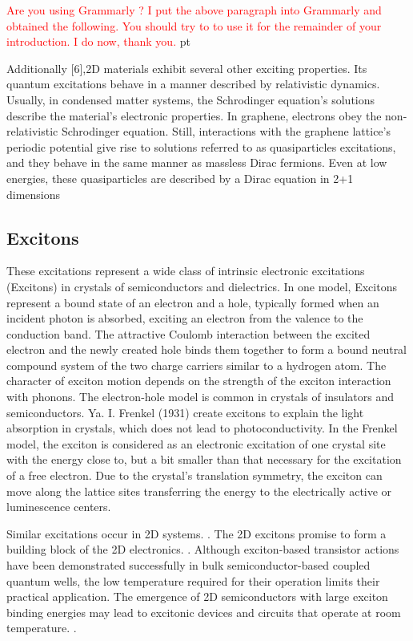 \textcolor{red}{Are you using Grammarly ? I put the above paragraph into Grammarly and obtained the following. You should
try to to use it for the remainder of your introduction.
I do now, thank you.}
 pt

Additionally [6],2D materials exhibit several other exciting properties. Its quantum excitations behave in a manner described by relativistic dynamics. Usually, in condensed matter systems, the Schrodinger equation's solutions describe the material's electronic properties. In graphene, electrons obey the non-relativistic Schrodinger equation. Still, interactions with the graphene lattice's periodic potential give rise to solutions referred to as quasiparticles excitations, and they behave in the same manner as massless Dirac fermions. Even at low energies, these quasiparticles are described by a Dirac equation in 2+1 dimensions 

\subsection{Excitons}
These excitations represent a wide class of intrinsic electronic excitations (Excitons) \cite{Excitons1, Excitons2} in crystals of semiconductors and dielectrics. In one model, Excitons represent a bound state of an electron and a hole, typically formed when an incident photon is absorbed, exciting an electron from the valence to the conduction band. The attractive Coulomb interaction between the excited electron and the newly created hole binds them together to form a bound neutral compound system of the two charge carriers similar to a hydrogen atom. 
The character of exciton motion depends on the strength of the exciton interaction with phonons. The electron-hole model is common in crystals of insulators and semiconductors.
Ya. I. Frenkel (1931) create excitons to explain the light absorption in crystals, which does not lead to photoconductivity. In the Frenkel model, the exciton is considered as an electronic excitation of one crystal site with the energy close to, but a bit smaller than that necessary for the excitation of a free electron. Due to the crystal's translation symmetry, the exciton can move along the lattice sites transferring the energy to the electrically active or luminescence centers.

Similar excitations occur in 2D systems. \cite{Excitons2D1,Excitons2D3}. The 2D excitons promise to form a building block of the 2D electronics. \cite{Excitons2D2}.  Although exciton-based transistor actions have been demonstrated successfully in bulk semiconductor-based coupled quantum wells, the low temperature required for their operation limits their practical application. The emergence of 2D semiconductors with large exciton binding energies may lead to excitonic devices and circuits that operate at room temperature. \cite{Excitons2D2}.

